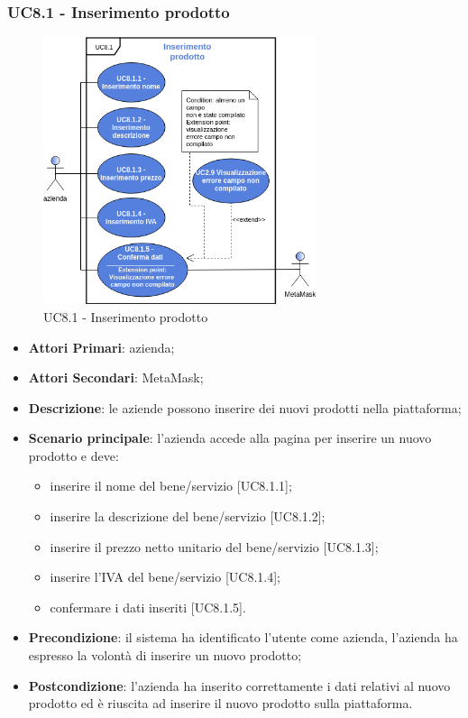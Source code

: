 \subsubsection{UC8.1 - Inserimento prodotto}
\begin{figure}[h]
	\includegraphics[width=8cm]{res/images/UC8-Inserimento.png}
	\centering
	\caption{UC8.1 - Inserimento prodotto}
\end{figure}
\begin{itemize}
	\item \textbf{Attori Primari}: azienda;
	\item \textbf{Attori Secondari}: MetaMask\glo;
	\item \textbf{Descrizione}: le aziende possono inserire dei nuovi prodotti nella piattaforma;
	\item \textbf{Scenario principale}: l'azienda accede alla pagina per inserire un nuovo prodotto e deve:
	\begin{itemize}
		\item inserire il nome del bene/servizio [UC8.1.1];
		\item inserire la descrizione del bene/servizio [UC8.1.2];
		\item inserire il prezzo netto unitario del bene/servizio [UC8.1.3];
		\item inserire l'IVA del bene/servizio [UC8.1.4];
		\item confermare i dati inseriti [UC8.1.5].
		
	\end{itemize}
	\item \textbf{Precondizione}: il sistema ha identificato l'utente come azienda, l'azienda ha espresso la volontà di inserire un nuovo prodotto;
	\item \textbf{Postcondizione}: l'azienda ha inserito correttamente i dati relativi al nuovo prodotto ed è riuscita ad inserire il nuovo prodotto sulla piattaforma.	
\end{itemize}
